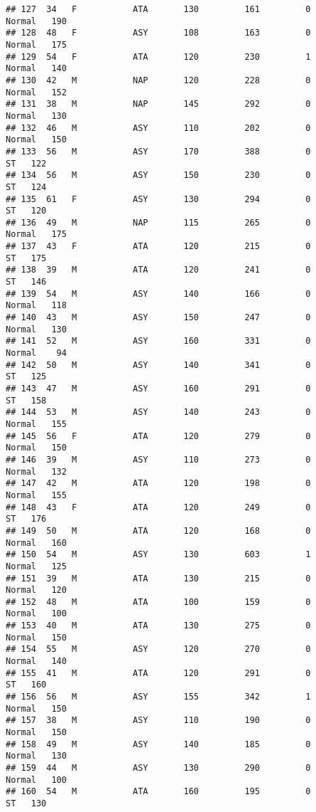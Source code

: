 \documentclass[
]{article}
\begin{document}
\begin{verbatim}
## 127  34   F           ATA       130         161         0     Normal   190
## 128  48   F           ASY       108         163         0     Normal   175
## 129  54   F           ATA       120         230         1     Normal   140
## 130  42   M           NAP       120         228         0     Normal   152
## 131  38   M           NAP       145         292         0     Normal   130
## 132  46   M           ASY       110         202         0     Normal   150
## 133  56   M           ASY       170         388         0         ST   122
## 134  56   M           ASY       150         230         0         ST   124
## 135  61   F           ASY       130         294         0         ST   120
## 136  49   M           NAP       115         265         0     Normal   175
## 137  43   F           ATA       120         215         0         ST   175
## 138  39   M           ATA       120         241         0         ST   146
## 139  54   M           ASY       140         166         0     Normal   118
## 140  43   M           ASY       150         247         0     Normal   130
## 141  52   M           ASY       160         331         0     Normal    94
## 142  50   M           ASY       140         341         0         ST   125
## 143  47   M           ASY       160         291         0         ST   158
## 144  53   M           ASY       140         243         0     Normal   155
## 145  56   F           ATA       120         279         0     Normal   150
## 146  39   M           ASY       110         273         0     Normal   132
## 147  42   M           ATA       120         198         0     Normal   155
## 148  43   F           ATA       120         249         0         ST   176
## 149  50   M           ATA       120         168         0     Normal   160
## 150  54   M           ASY       130         603         1     Normal   125
## 151  39   M           ATA       130         215         0     Normal   120
## 152  48   M           ATA       100         159         0     Normal   100
## 153  40   M           ATA       130         275         0     Normal   150
## 154  55   M           ASY       120         270         0     Normal   140
## 155  41   M           ATA       120         291         0         ST   160
## 156  56   M           ASY       155         342         1     Normal   150
## 157  38   M           ASY       110         190         0     Normal   150
## 158  49   M           ASY       140         185         0     Normal   130
## 159  44   M           ASY       130         290         0     Normal   100
## 160  54   M           ATA       160         195         0         ST   130

\end{verbatim}
\end{document}
